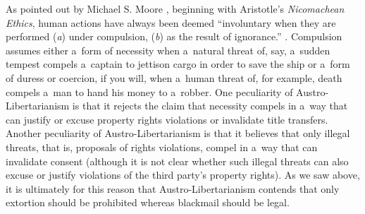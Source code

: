 {As pointed out by Michael S. Moore 
\parencite*[][p.85]{moore_law_1984}, %
 beginning with Aristotle's \textit{Nicomachean Ethics}, human actions have always been deemed ``involuntary when they are performed (\textit{a}) under compulsion, (\textit{b}) as the result of ignorance.'' 
\parencite[][p.77 [Book III]{}. %
 Compulsion assumes either a~form of necessity when a~natural threat of, say, a~sudden tempest compels a~captain to jettison cargo in order to save the ship or a~form of duress or coercion, if you will, when a~human threat of, for example, death compels a~man to hand his money to a~robber. One peculiarity of Austro-Libertarianism is that it rejects the claim that necessity compels in a~way that can justify or excuse property rights violations or invalidate title transfers. Another peculiarity of Austro-Libertarianism is that it believes that only illegal threats, that is, proposals of rights violations, compel in a~way that can invalidate consent (although it is not clear whether such illegal threats can also excuse or justify violations of the third party's property rights). As we saw above, it is ultimately for this reason that Austro-Libertarianism contends that only extortion should be prohibited whereas blackmail should be legal.



}
